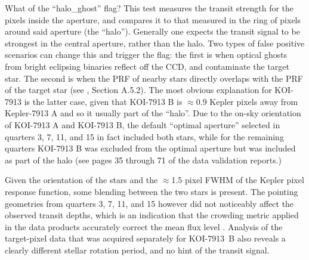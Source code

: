 \documentclass[12pt,twocolumn]{aastex63}
\begin{document}
What of the ``halo\_ghost'' flag?  This test measures the transit
strength for the pixels inside the aperture, and compares it to that
measured in the ring of pixels around said aperture (the ``halo'').
Generally one expects the transit signal to be strongest in the
central aperture, rather than the halo.  Two types of false positive
scenarios can change this and trigger the flag: the first is when
optical ghosts from bright eclipsing binaries reflect off the CCD, and
contaminate the target star.  The second is when the PRF of nearby
stars directly overlaps with the PRF of the target star (see
\citealt{thompson_planetary_2018}, Section A.5.2).  The most obvious
explanation for KOI-7913 is the latter case, given that KOI-7913 B is
$\approx0.9$ Kepler pixels away from Kepler-7913 A and so it usually
part of the ``halo''.  Due to the on-sky orientation of KOI-7913 A and
KOI-7913 B, the default ``optimal aperture'' selected in quarters 3,
7, 11, and 15 in fact included both stars, while for the remaining
quarters KOI-7913 B was excluded from the optimal aperture but was
included as part of the halo (see pages 35 through 71 of the data
validation reports.)  

Given the orientation of the stars and the $\approx$1.5 pixel FWHM of
the Kepler pixel response function, some blending between the two
stars is present.  The pointing geometries from quarters 3, 7, 11, and
15 however did not noticeably affect the observed transit depths,
which is an indication that the crowding metric applied in the data
products accurately correct the mean flux level
\citep{2017ksci.rept....6M}.  Analysis of the target-pixel data that
was acquired separately for KOI-7913~B also reveals a clearly
different stellar rotation period, and no hint of the transit signal.



\end{document}
